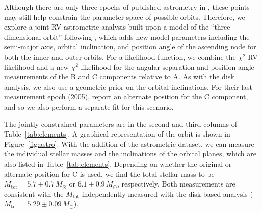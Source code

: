 \documentclass[twocolumn]{aastex61}
\begin{document}
Although there are only three epochs of published astrometry in \citet{berger11}, these points may still help constrain the parameter space of possible orbits. Therefore, we explore a joint RV-astrometric analysis built upon a model of the ``three-dimensional orbit'' following \citet{murray10}, which adds new model parameters including the semi-major axis, orbital inclination, and position angle of the ascending node for both the inner and outer orbits. For a likelihood function, we combine the $\chi^2$ RV likelihood and a new $\chi^2$ likelihood for the angular separation and position angle measurements of the B and C components relative to A. As with the disk analysis, we also use a geometric prior on the orbital inclinations. For their last measurement epoch (2005), \citet{berger11} report an alternate position for the C component, and so we also perform a separate fit for this scenario.

The jointly-constrained parameters are in the second and third columns of Table~\ref{tab:elements}.  A graphical representation of the orbit is shown in Figure~\ref{fig:astro}. With the addition of the astrometric dataset, we can measure the individual stellar masses and the inclinations of the orbital planes, which are also listed in Table~\ref{tab:elements}. Depending on whether the original or alternate position for C is used, we find the total stellar mass to be $M_\mathrm{tot} = 5.7 \pm 0.7\,M_\odot$ or $6.1 \pm 0.9\,M_\odot$, respectively. Both measurements are consistent with the $M_\mathrm{tot}$ independently measured with the disk-based analysis ($M_\mathrm{tot} = 5.29 \pm 0.09\,M_\odot$).
\end{document}
